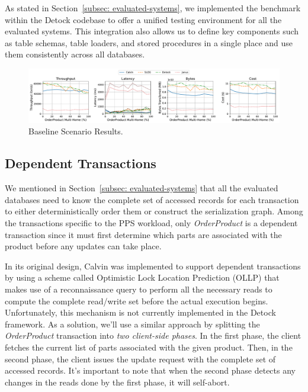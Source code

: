 As stated in Section~\ref{subsec: evaluated-systems}, we implemented the benchmark within the Detock codebase to offer a unified testing environment for all the evaluated systems. This integration also allows us to define key components such as table schemas, table loaders, and stored procedures in a single place and use them consistently across all databases.

\begin{figure}[t]
    \centering
    \includegraphics[width=1\textwidth]{figures/Baseline.pdf}
    \caption{Baseline Scenario Results.}
    \label{fig: baseline-scenario}
\end{figure}

\subsection{Dependent Transactions}
\label{subsec: dependent-transactions}
We mentioned in Section~\ref{subsec: evaluated-systems} that all the evaluated databases need to know the complete set of accessed records for each transaction to either deterministically order them or construct the serialization graph. Among the transactions specific to the PPS workload, only \textit{OrderProduct} is a dependent transaction since it must first determine which parts are associated with the product before any updates can take place. 

In its original design, Calvin was implemented to support dependent transactions by using a scheme called Optimistic Lock Location Prediction (OLLP) that makes use of a reconnaissance query to perform all the necessary reads to compute the complete read/write set before the actual execution begins. Unfortunately, this mechanism is not currently implemented in the Detock framework. As a solution, we'll use a similar approach by splitting the \textit{OrderProduct} transaction into \textit{two client-side phases}. In the first phase, the client fetches the current list of parts associated with the given product. Then, in the second phase, the client issues the update request with the complete set of accessed records. It's important to note that when the second phase detects any changes in the reads done by the first phase, it will self-abort.

